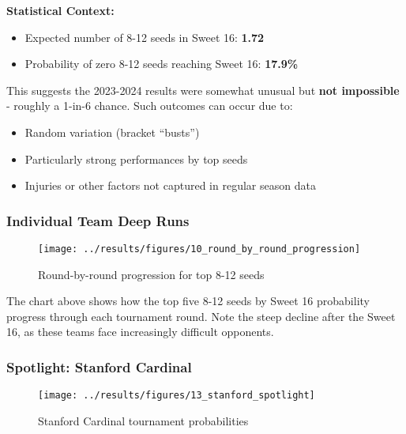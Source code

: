 \documentclass[
]{article}
\providecommand{\tightlist}{%
  \setlength{\itemsep}{0pt}\setlength{\parskip}{0pt}}
\begin{document}
\textbf{Statistical Context:}

\begin{itemize}
\tightlist
\item
  Expected number of 8-12 seeds in Sweet 16: \textbf{1.72}
\item
  Probability of zero 8-12 seeds reaching Sweet 16: \textbf{17.9\%}
\end{itemize}

This suggests the 2023-2024 results were somewhat unusual but
\textbf{not impossible} - roughly a 1-in-6 chance. Such outcomes can
occur due to:

\begin{itemize}
\tightlist
\item
  Random variation (bracket ``busts'')
\item
  Particularly strong performances by top seeds
\item
  Injuries or other factors not captured in regular season data
\end{itemize}

\subsubsection{Individual Team Deep
Runs}\label{individual-team-deep-runs}

\begin{figure}

{\centering \texttt{[image: ../results/figures/10\_round\_by\_round\_progression]} 

}

\caption{Round-by-round progression for top 8-12 seeds}\label{fig:round-progression-plot}
\end{figure}

The chart above shows how the top five 8-12 seeds by Sweet 16
probability progress through each tournament round. Note the steep
decline after the Sweet 16, as these teams face increasingly difficult
opponents.

\subsubsection{Spotlight: Stanford
Cardinal}\label{spotlight-stanford-cardinal}

\begin{figure}

{\centering \texttt{[image: ../results/figures/13\_stanford\_spotlight]} 

}

\caption{Stanford Cardinal tournament probabilities}\label{fig:stanford-spotlight}
\end{figure}
\end{document}
